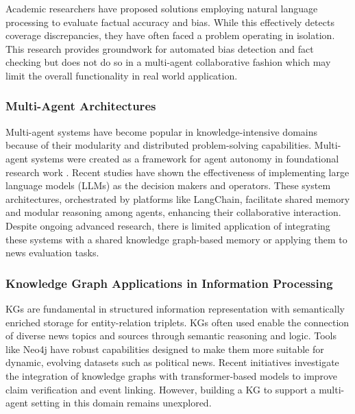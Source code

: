 \documentclass[11pt]{article}
\begin{document}
Academic researchers have proposed solutions employing natural language processing to evaluate factual accuracy and bias\cite{r19}. While this effectively detects coverage discrepancies, they have often faced a problem operating in isolation.  This research provides groundwork for automated bias detection and fact checking but does not do so in a multi-agent collaborative fashion which may limit the overall functionality in real world application.

\subsubsection{Multi-Agent Architectures}
Multi-agent systems have become popular in knowledge-intensive domains because of their modularity and distributed problem-solving capabilities. Multi-agent systems were created as a framework for agent autonomy in foundational research work \cite{r20}. Recent studies have shown the effectiveness of implementing large language models (LLMs) as the decision makers and operators\cite{r21}\cite{r22}. These system architectures, orchestrated by platforms like LangChain\cite{r23}, facilitate shared memory and modular reasoning among agents, enhancing their collaborative interaction. Despite ongoing advanced research, there is limited application of integrating these systems with a shared knowledge graph-based memory or applying them to news evaluation tasks.

\subsubsection{Knowledge Graph Applications in Information Processing}
KGs are fundamental in structured information representation with semantically enriched storage for entity-relation triplets. KGs often used enable the connection of diverse news topics and sources through semantic reasoning and logic. Tools like Neo4j have robust capabilities designed to make them more suitable for dynamic, evolving datasets such as political news. Recent initiatives \cite{r24}\cite{r25}investigate the integration of knowledge graphs with transformer-based models to improve claim verification and event linking. However, building a KG to support a multi-agent setting in this domain remains unexplored.
\end{document}
